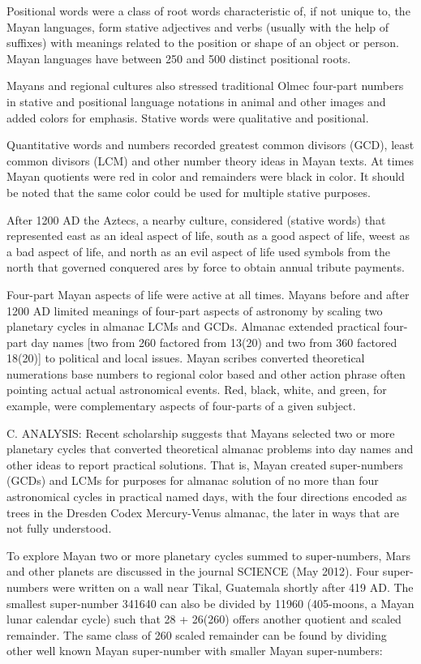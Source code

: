 \documentclass[12pt]{article}
\begin{document}
Positional words were a class of root words characteristic of, if not unique to, the Mayan languages, form stative adjectives and verbs (usually with the help of suffixes) with meanings related to the position or shape of an object or person. Mayan languages have between 250 and 500 distinct positional roots.

Mayans and regional cultures also stressed traditional Olmec four-part numbers in stative and positional language notations in animal and other images and added colors for emphasis.  Stative words were qualitative and positional. 

Quantitative words and numbers recorded greatest common divisors (GCD), least common divisors (LCM) and other number theory ideas in Mayan texts. At times Mayan quotients were red in color and remainders were black in color. It should be noted that the same color could be used for multiple stative purposes.    

After 1200 AD the Aztecs, a nearby  culture, considered (stative words) that represented east as an ideal aspect of life, south as a good aspect of life, weest as a bad aspect of life, and north as an evil aspect of life used symbols from the north that governed conquered ares by force to obtain annual tribute payments. 

Four-part Mayan aspects of life were active at all times. Mayans before and after 1200 AD limited meanings of four-part aspects of astronomy by scaling two planetary cycles in almanac LCMs and GCDs. Almanac extended practical four-part day names [two from 260 factored from 13(20) and two from 360 factored 18(20)] to political and local issues. Mayan scribes converted theoretical numerations base numbers to regional color based and other action phrase often pointing actual actual astronomical events. Red, black, white, and green, for example, were complementary aspects of four-parts of a given subject.

C. ANALYSIS: Recent scholarship suggests that Mayans selected two or more planetary cycles that converted theoretical almanac problems into day names and other ideas to report practical solutions. That is, Mayan created super-numbers (GCDs) and LCMs for purposes for almanac solution of no more than four astronomical cycles in practical named days, with the four directions encoded as trees in the Dresden Codex Mercury-Venus almanac, the later in ways that are not fully understood.

To explore Mayan two or more planetary cycles summed to super-numbers, Mars and other planets are discussed in the journal SCIENCE (May 2012). Four super-numbers were written on a wall near Tikal, Guatemala shortly after 419 AD. The smallest super-number 341640 can also be divided by 11960 (405-moons, a Mayan lunar calendar cycle) such that 28 + 26(260) offers another quotient and scaled remainder. The same class of 260 scaled remainder can be found by dividing other well known Mayan super-number with smaller Mayan super-numbers:
\end{document}
